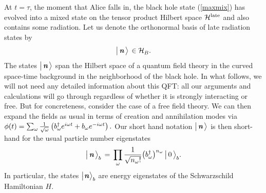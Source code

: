 \documentclass[12pt]{article}%
\def\spc{\hspace{.5pt}}
\def\be{\begin{equation}}
\def\ee{\end{equation}}
\begin{document}
At $t=\tau$,  the moment that Alice falls in, the black hole state (\ref{maxmix})
has evolved into a mixed state on the tensor product Hilbert space ${\cal H}^{\rm late}$ and also contains some radiation. 
Let us denote the orthonormal basis of late radiation states by
$$
\bigll| \,\nom\,\bigrr \rangle\, \in {\cal H}_\BB.
$$
The states $\bigl| \,{ \textit{\textbf n}}\,\bigr \rangle$ span the Hilbert space of a quantum field theory in the curved space-time background in the neighborhood
of the black hole. In what follows, we will not need any detailed information about this QFT: all our arguments and calculations will go through 
regardless of whether it is strongly interacting or free. But for concreteness,  consider the case of a free field theory. We can then 
expand the fields as usual in terms of creation and annihilation modes via 
$\phi(t) = \sum_\omega {1\over \sqrt{\omega}} \left( b^\dagger_\omega e^{i\omega t} + b_\omega e^{-i\omega t}\right).$
Our short hand notation $\bigl| \,{ \textit{\textbf n}}\,\bigr \rangle{}$  is then short-hand for the usual particle number eigenstates
\be
\label{fockstates}
\bigll| \,\nom\,\bigrr \rangle_\bB\, =
\,\prod_{\omega}
{1\over \sqrt{n_\omega!}} 
\bigll( b^\dagger_\omega\bigrr)^{n_\omega}\, \bigll| \,0 \,\bigrr \rangle_\bB.
\ee
In particular, the states $\bigl| \spc\nom\spc\bigr\rangle_\bB$ are energy eigenstates of the Schwarzschild Hamiltonian $H$.
\end{document}

